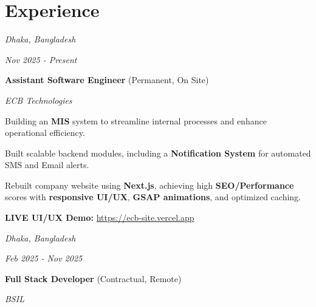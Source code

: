 \section{Experience}
\begin{twocolentry}{
    \textit{Dhaka, Bangladesh}

    \textit{Nov 2025 - Present}}
        \textbf{Assistant Software Engineer} (Permanent, On Site)

        \textit{ECB Technologies}
    \end{twocolentry}

    \vspace{0.10 cm}
    \begin{onecolentry}
        \begin{highlights}
            \item Building an \textbf{MIS} system to streamline internal processes and enhance operational efficiency.
            \item Built scalable backend modules, including a \textbf{Notification System} for automated SMS and Email alerts.
            \item Rebuilt company website using \textbf{Next.js}, achieving high \textbf{SEO/Performance} scores with \textbf{responsive UI/UX}, \textbf{GSAP animations}, and optimized caching.
            \item \textbf{LIVE UI/UX Demo:} \url{https://ecb-site.vercel.app}
        \end{highlights}
    \end{onecolentry}
    \vspace{0.20 cm}
    \begin{twocolentry}{
    \textit{Dhaka, Bangladesh}

    \textit{Feb 2025 - Nov 2025}}
        \textbf{Full Stack Developer} (Contractual, Remote)
        
        \textit{BSIL}
    \end{twocolentry}

